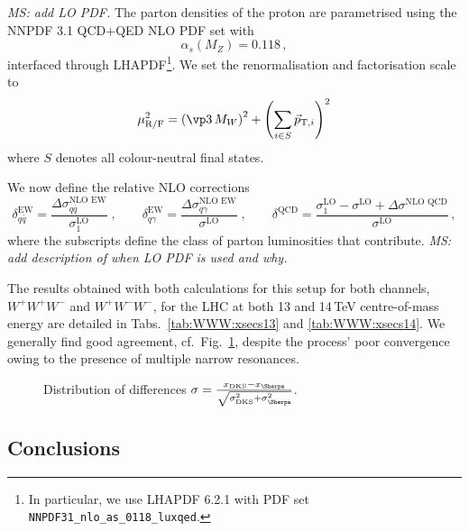 \textit{MS: add LO PDF.}
The parton densities of the proton are parametrised using the 
NNPDF 3.1 QCD+QED NLO PDF set \cite{} with 
\begin{equation}
  \alpha_s(M_Z)=0.118\nonumber\,,
\end{equation}
interfaced through \textsc{LHAPDF}\footnote{
  In particular, we use \textsc{LHAPDF} 6.2.1 with PDF set 
  \texttt{NNPDF31\_nlo\_as\_0118\_luxqed}.
}. 
We set the renormalisation and factorisation scale to 
\begin{equation}
  \mu_\text{R/F}^2=\left(\vp3\,M_W\right)^2+\left(\sum\limits_{i\in S}\vec{p}_{\mathrm{T},i}\right)^2
\end{equation}
where $S$ denotes all colour-neutral final states.

We now define the relative NLO corrections 
\begin{equation}
  \delta_{q\bar{q}}^\text{EW}
  =\frac{\Delta\sigma_{q\bar{q}}^\text{NLO EW}}{\sigma_1^\text{LO}}
  \;,\qquad
  \delta_{q\gamma}^\text{EW}
  =\frac{\Delta\sigma_{q\gamma}^\text{NLO EW}}{\sigma^\text{LO}}
  \;,\qquad
  \delta^\text{QCD}
  =\frac{\sigma_1^\text{LO}-\sigma^\text{LO}+\Delta\sigma^\text{NLO QCD}}{\sigma^\text{LO}}\,,
\end{equation}
where the subscripts define the class of parton luminosities 
that contribute.
\textit{MS: add description of when LO PDF is used and why.}

The results obtained with both calculations for this setup 
for both channels, $W^+W^+W^-$ and $W^+W^-W^-$, for the LHC 
at both 13 and 14\,TeV centre-of-mass energy are detailed 
in Tabs.\ \ref{tab:WWW:xsecs13} and \ref{tab:WWW:xsecs14}. 
We generally find good agreement, cf.\ Fig.\ \ref{fig:WWW:xscomp},
despite the process' poor convergence owing to the presence 
of multiple narrow resonances.

\begin{figure}[t!]
  \centering
  \caption{
    Distribution of differences $\sigma=\frac{x_\text{DKS}-x_\text{\Sherpa}}{\sqrt{\sigma_\text{DKS}^2+\sigma_\text{\Sherpa}^2}}$.
    \label{fig:WWW:xscomp}
  }
\end{figure}





\subsection{Conclusions}
\label{sec:WWW:conclusions}



\let\Herwig\undefined
\let\Pythia\undefined
\let\Sherpa\undefined
\let\Rivet\undefined
\let\Recola\undefined
\let\Professor\undefined
\let\Amegic\undefined
\let\OpenLoops\undefined
\let\Collier\undefined
\let\eps\undefined
\let\mc\undefined
\let\mr\undefined
\let\mb\undefined
\let\tm\undefined
\let\vp\undefined
\let\vP\undefined




